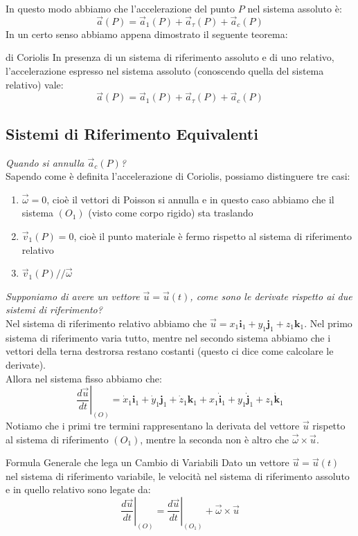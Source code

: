 \documentclass[11pt,a4paper,twoside]{article}
\theoremstyle{definition}
\begin{document}
In questo modo abbiamo che l'accelerazione del punto $P$ nel sistema assoluto è:
\[\vec a(P) = \vec a_1(P) + \vec a_\tau(P) + \vec a_c(P)\]
In un certo senso abbiamo appena dimostrato il seguente teorema:

\begin{thm}{di Coriolis}{}\label{Coriolis}
	In presenza di un sistema di riferimento assoluto e di uno relativo, l'accelerazione espresso nel sistema assoluto (conoscendo quella del sistema relativo) vale:
	\[ \vec a(P) = \vec a_1(P) + \vec a_\tau(P) + \vec a_c(P) \]
\end{thm}

\subsection{Sistemi di Riferimento Equivalenti}

\textit{Quando si annulla $\vec a_c(P)$?}\\
Sapendo come è definita l'accelerazione di Coriolis, possiamo distinguere tre casi:
\begin{enumerate}
	\item $\vec \omega = 0$, cioè il vettori di Poisson si annulla e in questo caso abbiamo che il sistema $(O_1)$ (visto come corpo rigido) sta traslando
	\item $\vec v_1(P) = 0$, cioè il punto materiale è fermo rispetto al sistema di riferimento relativo
	\item $\vec v_1(P) /\!/ \vec \omega$
\end{enumerate}

\textit{Supponiamo di avere un vettore $\vec u = \vec u(t)$, come sono le derivate rispetto ai due sistemi di riferimento?}\\
Nel sistema di riferimento relativo abbiamo che $\vec u = x_1 \mathbf i_1 + y_1 \mathbf j_1 + z_1 \mathbf k_1$. Nel primo sistema di riferimento varia tutto, mentre nel secondo sistema abbiamo che i vettori della terna destrorsa restano costanti (questo ci dice come calcolare le derivate).\\
Allora nel sistema fisso abbiamo che:
\[ \left.\frac{d\vec u}{dt}\right|_{(O)} = \dot x_1 \mathbf i_1 + \dot y_1 \mathbf j_1 + \dot z_1 \mathbf k_1 + x_1 \dot{\mathbf i}_1 + y_1 \dot{\mathbf j}_1 + z_1 \dot{\mathbf k}_1\]
Notiamo che i primi tre termini rappresentano la derivata del vettore $\vec u$ rispetto al sistema di riferimento $(O_1)$, mentre la seconda non è altro che $\vec \omega \times \vec u$.

\begin{defn}{Formula Generale che lega un Cambio di Variabili}{}
	Dato un vettore $\vec u = \vec u(t)$ nel sistema di riferimento variabile, le velocità nel sistema di riferimento assoluto e in quello relativo sono legate da:
	\[ \left.\frac{d\vec u}{dt}\right|_{(O)} = \left.\frac{d\vec u}{dt}\right|_{(O_1)} + \vec \omega \times \vec u \]
\end{defn}
\end{document}
